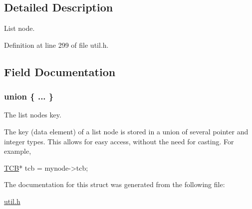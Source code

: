 \subsection{Detailed Description}
List node. 

Definition at line 299 of file util.\+h.



\subsection{Field Documentation}
\subsubsection[{\texorpdfstring{"@5}{@5}}]{\setlength{\rightskip}{0pt plus 5cm}union \{ ... \} }\hypertarget{structresource__list__node_aba8874eccf1ac3e7657c726a4f86536c}{}\label{structresource__list__node_aba8874eccf1ac3e7657c726a4f86536c}


The list node\textquotesingle{}s key. 

The key (data element) of a list node is stored in a union of several pointer and integer types. This allows for easy access, without the need for casting. For example, 
\begin{DoxyCode}
\hyperlink{structthread__control__block}{TCB}* tcb = mynode->tcb;
\end{DoxyCode}
 

The documentation for this struct was generated from the following file\+:\begin{DoxyCompactItemize}
\item 
\hyperlink{util_8h}{util.\+h}\end{DoxyCompactItemize}
